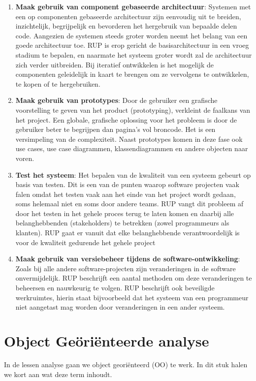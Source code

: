 	\begin{enumerate}
	\item \textbf{Maak gebruik van component gebaseerde architectuur}: Systemen met een op componenten gebaseerde architectuur zijn eenvoudig uit te breiden, inzichtelijk, begrijpelijk en bevorderen het hergebruik van bepaalde delen code. Aangezien de systemen steeds groter worden neemt het belang van een goede architectuur toe. RUP is erop gericht de basisarchitectuur in een vroeg stadium te bepalen, en naarmate het systeem groter wordt zal de architectuur zich verder uitbreiden. Bij iteratief ontwikkelen is het mogelijk de componenten geleidelijk in kaart te brengen om ze vervolgens te ontwikkelen, te kopen of te hergebruiken.
	\item \textbf{Maak gebruik van prototypes}: Door de gebruiker een grafische voorstelling te geven van het product (prototyping), verkleint de faalkans van het project. Een globale, grafische oplossing voor het probleem is door de gebruiker beter te begrijpen dan pagina's vol broncode. Het is een versimpeling van de complexiteit. Naast prototypes komen in deze fase ook use cases, use case diagrammen, klassendiagrammen en andere objecten naar voren.
	\item \textbf{Test het systeem}: Het bepalen van de kwaliteit van een systeem gebeurt op basis van testen. Dit is een van de punten waarop software projecten vaak falen omdat het testen vaak aan het einde van het project wordt gedaan, soms helemaal niet en soms door andere teams. RUP vangt dit probleem af door het testen in het gehele proces terug te laten komen en daarbij alle belanghebbenden (stakeholders) te betrekken (zowel programmeurs als klanten). RUP gaat er vanuit dat elke belanghebbende verantwoordelijk is voor de kwaliteit gedurende het gehele project
	\item \textbf{Maak gebruik van versiebeheer tijdens de software-ontwikkeling}: Zoals bij alle andere software-projecten zijn veranderingen in de software onvermijdelijk. RUP beschrijft een aantal methoden om deze veranderingen te beheersen en nauwkeurig te volgen. RUP beschrijft ook beveiligde werkruimtes, hierin staat bijvoorbeeld dat het systeem van een programmeur niet aangetast mag worden door veranderingen in een ander systeem.
\end{enumerate}


\section{Object Ge\"ori\"enteerde analyse}
In de lessen analyse gaan we object geori\"enteerd (OO) te werk. In dit stuk halen we kort aan wat deze term inhoudt.

